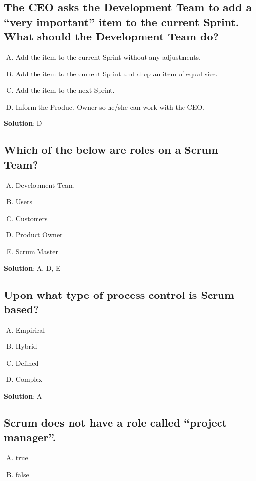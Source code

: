 \subsection{The CEO asks the Development Team to add a \enquote{very important} item to the current Sprint. What should the Development Team do?}
\begin{enumerate}[A)]
  \item Add the item to the current Sprint without any adjustments.
  \item Add the item to the current Sprint and drop an item of equal size.
  \item Add the item to the next Sprint.
  \item Inform the Product Owner so he/she can work with the CEO.
\end{enumerate}


\textbf{Solution}: D


\subsection{Which of the below are roles on a Scrum Team?}
\begin{enumerate}[A)]
  \item Development Team
  \item Users
  \item Customers
  \item Product Owner
  \item Scrum Master
\end{enumerate}


\textbf{Solution}: A, D, E


\subsection{Upon what type of process control is Scrum based?}
\begin{enumerate}[A)]
  \item Empirical
  \item Hybrid
  \item Defined
  \item Complex
\end{enumerate}


\textbf{Solution}: A


\subsection{Scrum does not have a role called \enquote{project manager}.}
\begin{enumerate}[A)]
  \item true
  \item false
\end{enumerate}


